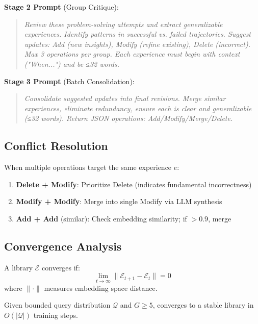 \textbf{Stage 2 Prompt} (Group Critique):
\begin{quote}
\textit{Review these problem-solving attempts and extract generalizable experiences. Identify patterns in successful vs. failed trajectories. Suggest updates: Add (new insights), Modify (refine existing), Delete (incorrect). Max 3 operations per group. Each experience must begin with context ("When...") and be ≤32 words.}
\end{quote}

\textbf{Stage 3 Prompt} (Batch Consolidation):
\begin{quote}
\textit{Consolidate suggested updates into final revisions. Merge similar experiences, eliminate redundancy, ensure each is clear and generalizable (≤32 words). Return JSON operations: Add/Modify/Merge/Delete.}
\end{quote}

\subsection{Conflict Resolution}

When multiple operations target the same experience $e$:

\begin{enumerate}
    \item \textbf{Delete + Modify}: Prioritize Delete (indicates fundamental incorrectness)
    \item \textbf{Modify + Modify}: Merge into single Modify via LLM synthesis
    \item \textbf{Add + Add} (similar): Check embedding similarity; if $> 0.9$, merge
\end{enumerate}

\subsection{Convergence Analysis}

\begin{definition}
A library $\mathcal{E}$ converges if:
\begin{equation}
\lim_{t \to \infty} \|\mathcal{E}_{t+1} - \mathcal{E}_t\| = 0
\end{equation}
where $\|\cdot\|$ measures embedding space distance.
\end{definition}

\begin{theorem}
Given bounded query distribution $\mathcal{Q}$ and $G \geq 5$, \DSO{} converges to a stable library in $O(|\mathcal{Q}|)$ training steps.
\end{theorem}

